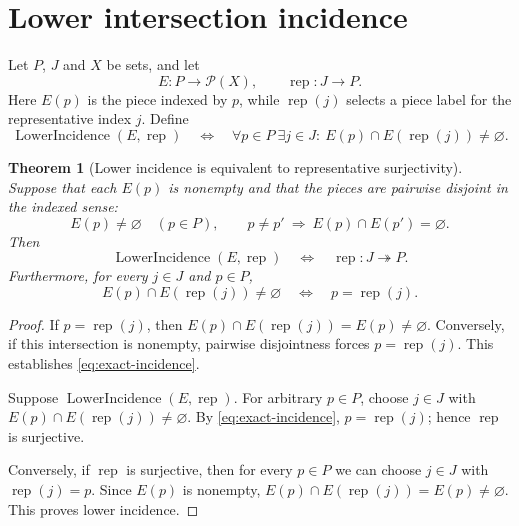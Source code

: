 \documentclass[11pt, letterpaper]{nyjm}
\newtheorem{theorem}{Theorem}[section]
\newcommand{\rep}{\operatorname{rep}}
\newcommand{\LowerIncidence}{\operatorname{LowerIncidence}}
\begin{document}
	\section{Lower intersection incidence}
	
	Let $P$, $J$ and $X$ be sets, and let
	\[
	E:P\longrightarrow\mathcal P(X),\qquad
	\rep:J\longrightarrow P.
	\]
	Here $E(p)$ is the piece indexed by $p$, while $\rep(j)$ selects a
	piece label for the representative index $j$. Define
	\begin{equation}\label{eq:lower-incidence}
		\LowerIncidence(E,\rep)
		\quad\Longleftrightarrow\quad
		\forall p\in P\ \exists j\in J:\ 
		E(p)\cap E(\rep(j))\ne\varnothing.
	\end{equation}
	
	\begin{theorem}[Lower incidence is equivalent to representative
		surjectivity]\label{thm:lower-surjectivity}
		Suppose that each $E(p)$ is nonempty and that the pieces are pairwise
		disjoint in the indexed sense:
		\[
		E(p)\ne\varnothing\quad(p\in P),\qquad
		p\ne p'\ \Longrightarrow\ E(p)\cap E(p')=\varnothing.
		\]
		Then
		\begin{equation}\label{eq:iff-surj}
			\boxed{
				\LowerIncidence(E,\rep)
				\quad\Longleftrightarrow\quad
				\rep:J\twoheadrightarrow P.}
		\end{equation}
		Furthermore, for every $j\in J$ and $p\in P$,
		\begin{equation}\label{eq:exact-incidence}
			E(p)\cap E(\rep(j))\ne\varnothing
			\quad\Longleftrightarrow\quad p=\rep(j).
		\end{equation}
	\end{theorem}
	
	\begin{proof}
		If $p=\rep(j)$, then
		$E(p)\cap E(\rep(j))=E(p)\ne\varnothing$.
		Conversely, if this intersection is nonempty, pairwise disjointness
		forces $p=\rep(j)$. This establishes \eqref{eq:exact-incidence}.
		
		Suppose $\LowerIncidence(E,\rep)$. For arbitrary $p\in P$,
		choose $j\in J$ with
		$E(p)\cap E(\rep(j))\ne\varnothing$. By
		\eqref{eq:exact-incidence}, $p=\rep(j)$; hence $\rep$ is surjective.
		
		Conversely, if $\rep$ is surjective, then for every $p\in P$ we can
		choose $j\in J$ with $\rep(j)=p$. Since $E(p)$ is nonempty,
		$E(p)\cap E(\rep(j))=E(p)\ne\varnothing$. This proves lower incidence.
	\end{proof}
	
\end{document}

